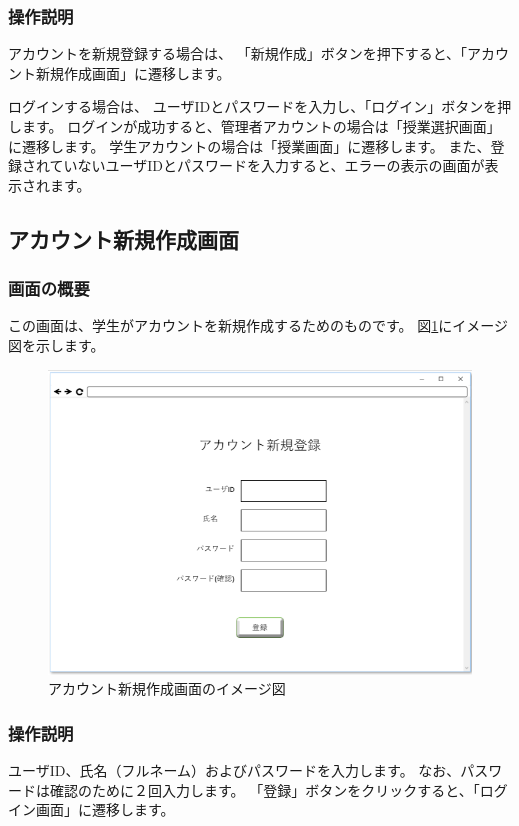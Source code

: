 \subsubsection{操作説明}
アカウントを新規登録する場合は、
「新規作成」ボタンを押下すると、「アカウント新規作成画面」に遷移します。

ログインする場合は、
ユーザIDとパスワードを入力し、「ログイン」ボタンを押します。
ログインが成功すると、管理者アカウントの場合は「授業選択画面」に遷移します。
学生アカウントの場合は「授業画面」に遷移します。
また、登録されていないユーザIDとパスワードを入力すると、エラーの表示の画面が表示されます。

\newpage

\subsection{アカウント新規作成画面}
\subsubsection{画面の概要}
この画面は、学生がアカウントを新規作成するためのものです。
図\ref{fig:03}にイメージ図を示します。


\begin{figure}[htbp]
  \begin{center}
    \includegraphics[width=1\linewidth,clip]{./img/03.png}
    \caption{アカウント新規作成画面のイメージ図}\label{fig:03}
  \end{center}
\end{figure}

\subsubsection{操作説明}
ユーザID、氏名（フルネーム）およびパスワードを入力します。
なお、パスワードは確認のために２回入力します。
「登録」ボタンをクリックすると、「ログイン画面」に遷移します。

